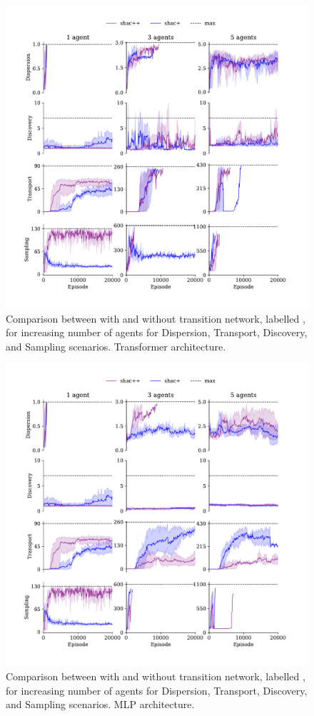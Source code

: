 
\begin{figure}[t]
    \centering
    \includegraphics[width=\textwidth]{figs/ablation-transformer.pdf}
    \caption{Comparison between \fname{} with and without transition network, labelled \fnamer{}, for increasing number of agents for Dispersion, Transport, Discovery, and Sampling scenarios. Transformer architecture.}
    \label{fig:ablation-transformer}
\end{figure}

\begin{figure}[t]
    \centering
    \includegraphics[width=\columnwidth]{figs/ablation-mlp.pdf}
    \caption{Comparison between \fname{} with and without transition network, labelled \fnamer{}, for increasing number of agents for Dispersion, Transport, Discovery, and Sampling scenarios. MLP architecture.}
    \label{fig:ablation-mlp}
\end{figure}

